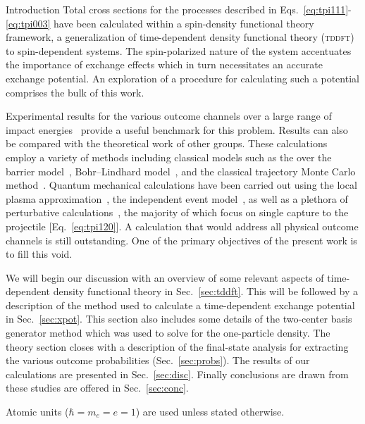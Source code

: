 \documentclass[aps, pra, reprint, groupedaddress, amsfonts, longbibliography,
               amsmath, amssymb, showpacs, nofootinbib]{revtex4-1}
\begin{document}
\begin{section}{Introduction \label{sec:intro}}
   Total cross sections for the processes described in Eqs.~\eqref{eq:tpi111}-\eqref{eq:tpi003} have
   been calculated within a spin-density functional theory~\cite{td-spindep} framework, a
   generalization of time-dependent density functional theory (\textsc{tddft})~\cite{tddft, ullrich} to
   spin-dependent systems. The spin-polarized nature of the system accentuates the importance of
   exchange effects which in turn necessitates an accurate exchange potential. An exploration of a
   procedure for calculating such a potential comprises the bulk of this work.

   Experimental results for the various outcome channels over a large range of impact
   energies~\cite{BS58, HN78, HSE78, dCFdP88, DT-88, Dub-89, ASL91, FTFHLP-95, SSMSM-11} provide a
   useful benchmark for this problem. Results can also be compared with the theoretical work of other
   groups. These calculations employ a variety of methods including classical models such as the over
   the barrier model~\cite{CC-07}, Bohr–Lindhard model~\cite{DYC-08, DLZ-12}, and the classical
   trajectory Monte Carlo method~\cite{GMZ17}. Quantum mechanical calculations have been carried out
   using the local plasma approximation~\cite{MMA03}, the independent event model~\cite{SM-03}, as well
   as a plethora of perturbative calculations~\cite{Mancev96, BOC05, Mancev-07, MG-10, NTC11, GG-12b,
   GAG15}, the majority of which focus on single capture to the projectile [Eq.~\eqref{eq:tpi120}]. A
   calculation that would address all physical outcome channels is still outstanding. One of the primary
   objectives of the present work is to fill this void.

   We will begin our discussion with an overview of some relevant aspects of time-dependent density
   functional theory in Sec.~\ref{sec:tddft}. This will be followed by a description of the method used
   to calculate a time-dependent exchange potential in Sec.~\ref{sec:xpot}. This section also includes
   some details of the two-center basis generator method which was used to solve for the one-particle
   density. The theory section closes with a description of the final-state analysis for extracting
   the various outcome probabilities (Sec.~\ref{sec:probs}). The results of our calculations are
   presented in Sec.~\ref{sec:disc}. Finally conclusions are drawn from these studies are offered in
   Sec.~\ref{sec:conc}.

   Atomic units ($\hbar = m_e = e = 1$) are used unless stated otherwise.

\end{section}
\end{document}

